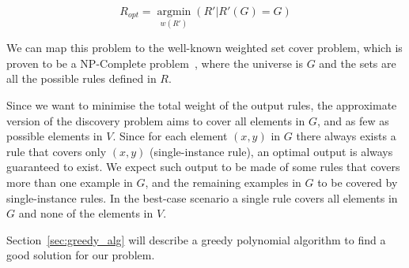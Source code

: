 $$R_{opt}=\underset{w(R')}{\operatorname{argmin}}(R'|R'(G) = G)$$


We can map this problem to the well-known weighted set cover problem, which is proven to be a NP-Complete problem~\cite{chvatal1979greedy}, where the universe is $G$ and the sets are all the possible rules defined in $R$.

Since we want to minimise the total weight of the output rules, the approximate version of the discovery problem aims to cover all elements in $G$, and as few as possible elements in $V$. Since for each element $(x,y)$ in $G$ there always exists a rule that covers only $(x,y)$ (single-instance rule), an optimal output is always guaranteed to exist. We expect such output to be made of some rules that covers more than one example in $G$, and the remaining examples in $G$ to be covered by single-instance rules. In the best-case scenario a single rule covers all elements in $G$ and none of the elements in $V$.

Section~\ref{sec:greedy_alg} will describe a greedy polynomial algorithm to find a good solution for our problem.



